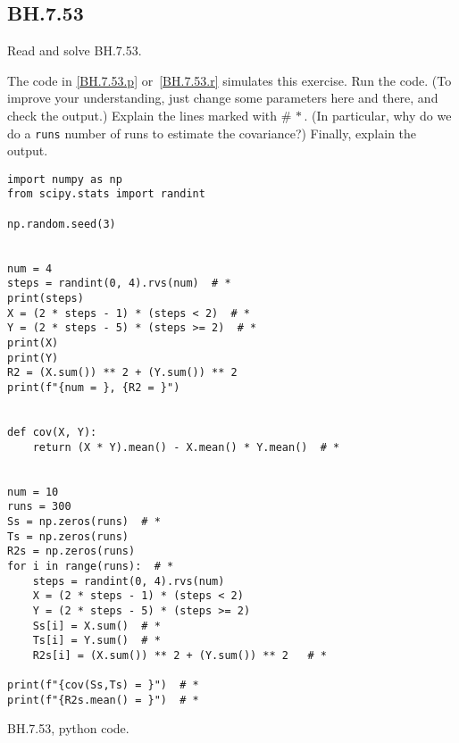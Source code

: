 

\subsection{BH.7.53}
\label{sec:bh.53}

\begin{exercise}
Read and solve BH.7.53.
\end{exercise}


\begin{exercise}
The code in \cref{BH.7.53.p} or~\cref{BH.7.53.r} simulates this exercise.
Run the code. (To improve your understanding, just change some parameters here and there, and check the output.) Explain the lines marked with $\# \, *$. (In particular, why do we do a \verb|runs| number of runs to estimate the covariance?) Finally, explain the output.
\end{exercise}

\begin{listing}[!ht]
\begin{verbatim}
import numpy as np
from scipy.stats import randint

np.random.seed(3)


num = 4
steps = randint(0, 4).rvs(num)  # *
print(steps)
X = (2 * steps - 1) * (steps < 2)  # *
Y = (2 * steps - 5) * (steps >= 2)  # *
print(X)
print(Y)
R2 = (X.sum()) ** 2 + (Y.sum()) ** 2
print(f"{num = }, {R2 = }")


def cov(X, Y):
    return (X * Y).mean() - X.mean() * Y.mean()  # *


num = 10
runs = 300
Ss = np.zeros(runs)  # *
Ts = np.zeros(runs)
R2s = np.zeros(runs)
for i in range(runs):  # *
    steps = randint(0, 4).rvs(num)
    X = (2 * steps - 1) * (steps < 2)
    Y = (2 * steps - 5) * (steps >= 2)
    Ss[i] = X.sum()  # *
    Ts[i] = Y.sum()  # *
    R2s[i] = (X.sum()) ** 2 + (Y.sum()) ** 2   # *

print(f"{cov(Ss,Ts) = }")  # *
print(f"{R2s.mean() = }")  # * 
\end{verbatim}
\caption{BH.7.53, python code.}
\label{BH.7.53.p}


\end{listing}

